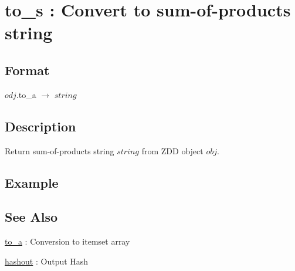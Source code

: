 
\section{to\_s : Convert to sum-of-products string  \label{sect:to_s}}
\subsection*{Format}
$odj$.to\_a $\rightarrow$ $string$

\subsection*{Description}
Return sum-of-products string $string$ from ZDD object $obj$.

\subsection*{Example}


\subsection*{See Also}
\hyperref[sect:to_a]{to\_a} : Conversion to itemset array

\hyperref[sect:hashout]{hashout} : Output Hash

